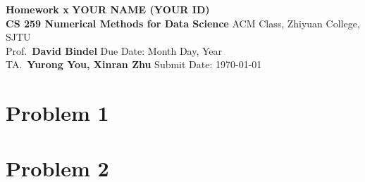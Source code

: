 \documentclass[a4paper, 11pt]{article}
\begin{document}
\noindent
\large\textbf{Homework x} \hfill \textbf{YOUR NAME (YOUR ID)} \\
\normalsize {\bf CS 259 Numerical Methods for Data Science} \hfill ACM Class, Zhiyuan College, SJTU\\
Prof.~{\bf David Bindel} \hfill Due Date: Month Day, Year\\
TA.~{\bf Yurong You, Xinran Zhu} \hfill Submit Date: \today

\section*{Problem 1}
\lipsum[1]

\section*{Problem 2}
\lipsum[2]
\end{document}
